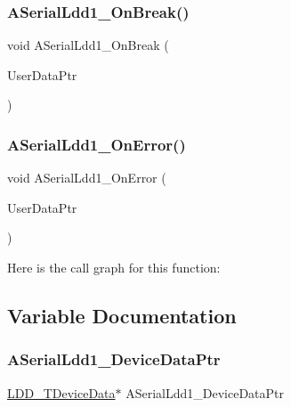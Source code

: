 \subsubsection{\texorpdfstring{A\+Serial\+Ldd1\+\_\+\+On\+Break()}{ASerialLdd1\_OnBreak()}}
{\footnotesize\ttfamily void A\+Serial\+Ldd1\+\_\+\+On\+Break (\begin{DoxyParamCaption}\item[{\hyperlink{group___p_e___types__module_ga0b66a73f87238a782318aa0be7578e35}{L\+D\+D\+\_\+\+T\+User\+Data} $\ast$}]{User\+Data\+Ptr }\end{DoxyParamCaption})}

\mbox{\label{group___a_s1__module_gab11d6ff796e37ab8d6c35dd8cc258f9a}} 
\subsubsection{\texorpdfstring{A\+Serial\+Ldd1\+\_\+\+On\+Error()}{ASerialLdd1\_OnError()}}
{\footnotesize\ttfamily void A\+Serial\+Ldd1\+\_\+\+On\+Error (\begin{DoxyParamCaption}\item[{\hyperlink{group___p_e___types__module_ga0b66a73f87238a782318aa0be7578e35}{L\+D\+D\+\_\+\+T\+User\+Data} $\ast$}]{User\+Data\+Ptr }\end{DoxyParamCaption})}

Here is the call graph for this function\+:


\subsection{Variable Documentation}
\mbox{\label{group___a_s1__module_ga19d4b715e209f6228d76c65b3d3e13b1}} 
\subsubsection{\texorpdfstring{A\+Serial\+Ldd1\+\_\+\+Device\+Data\+Ptr}{ASerialLdd1\_DeviceDataPtr}}
{\footnotesize\ttfamily \hyperlink{group___p_e___types__module_gac5cf1362f1f0e3a2ce71b1bf2276d091}{L\+D\+D\+\_\+\+T\+Device\+Data}$\ast$ A\+Serial\+Ldd1\+\_\+\+Device\+Data\+Ptr}

